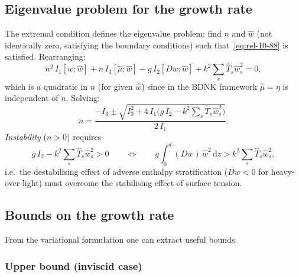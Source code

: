 \subsection{Eigenvalue problem for the growth rate}

The extremal condition defines the eigenvalue problem: find $n$ and
$\hat{w}$ (not identically zero, satisfying the boundary conditions)
such that~\eqref{eq:rel-10-88} is satisfied.  Rearranging:
\begin{equation}\label{eq:rel-10-eigenvalue}
  \boxed{
  n^{2}\,I_{1}[w;\hat{w}]
  + n\,I_{3}[\hat{\mu};\hat{w}]
  - g\,I_{2}[Dw;\hat{w}]
  + k^{2}\sum_{s}\hat{T}_{s}\hat{w}_{s}^{2}
  = 0,
  }
\end{equation}
which is a quadratic in $n$ (for given $\hat{w}$) since in the BDNK
framework $\hat{\mu} = \eta$ is independent of $n$.  Solving:
\begin{equation}\label{eq:rel-10-nquad}
  n = \frac{-I_{3} \pm \sqrt{I_{3}^{2}
    + 4\,I_{1}\bigl(g\,I_{2}
    - k^{2}\sum_{s}\hat{T}_{s}\hat{w}_{s}^{2}\bigr)}}
    {2\,I_{1}}.
\end{equation}
\emph{Instability} ($n > 0$) requires
\begin{equation}\label{eq:rel-10-instab-cond}
  g\,I_{2} - k^{2}\sum_{s}\hat{T}_{s}\hat{w}_{s}^{2} > 0
  \qquad\Longleftrightarrow\qquad
  g\!\int_{0}^{d}(Dw)\,\hat{w}^{2}\,\mathrm{d}z
  > k^{2}\sum_{s}\hat{T}_{s}\hat{w}_{s}^{2},
\end{equation}
i.e.\ the destabilising effect of adverse enthalpy stratification
($Dw < 0$ for heavy-over-light) must overcome the stabilising effect
of surface tension.

\subsection{Bounds on the growth rate}

From the variational formulation one can extract useful bounds.

\subsubsection*{Upper bound (inviscid case)}

